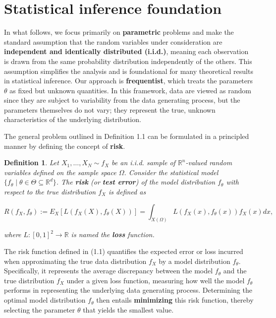 \documentclass{report}
\newtheorem{definition}{Definition}[chapter]
\begin{document}
\section{Statistical inference foundation}
In what follows, we focus primarily on \textbf{parametric} problems and make the standard assumption that the random variables under consideration are \textbf{independent and identically distributed (i.i.d.)}, meaning each observation is drawn from the same probability distribution independently of the others. This assumption simplifies the analysis and is foundational for many theoretical results in statistical inference. Our approach is \textbf{frequentist}, which treats the parameters $\theta$ as fixed but unknown quantities. In this framework, data are viewed as random since they are subject to variability from the data generating process, but the parameters themselves do not vary; they represent the true, unknown characteristics of the underlying distribution.

The general problem outlined in Definition 1.1 can be formulated in a principled manner by defining the concept of \textbf{risk}.

\begin{definition}
Let $X_1,\dots,X_N \sim f_X$ be an i.i.d. sample of $\mathbb{R}^n$-valued random variables defined on the sample space $\Omega$. Consider the statistical model $\{f_\theta \mid\theta\in\Theta\subseteq\mathbb{R}^d\}$. The \textbf{risk} (or \textbf{test error}) of the model distribution $f_\theta$ with respect to the true distribution $f_X$ is defined as

\begin{equation}
R(f_X,f_\theta) := E_X[L(f_X(X),f_\theta(X))] = \int_{X(\Omega)} L(f_X(x),f_\theta(x))f_X(x)dx,
\end{equation}

where $L : [0,1]^2 \to \mathbb{R}$ is named the \textbf{loss} function.
\end{definition}

The risk function defined in (1.1) quantifies the expected error or loss incurred when approximating the true data distribution $f_X$ by a model distribution $f_\theta$. Specifically, it represents the average discrepancy between the model $f_\theta$ and the true distribution $f_X$ under a given loss function, measuring how well the model $f_\theta$ performs in representing the underlying data generating process. Determining the optimal model distribution $f_\theta$ then entails \textbf{minimizing} this risk function, thereby selecting the parameter $\theta$ that yields the smallest value.
\end{document}

